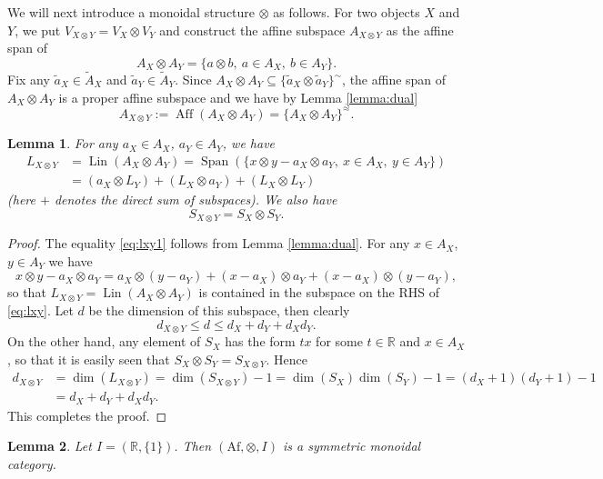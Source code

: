 \documentclass[12pt]{article}
\newtheorem{lemma}{Lemma}
\theoremstyle{definition}
\theoremstyle{remark}
\def\aff{\operatorname{Aff}}
\def\lin{\operatorname{Lin}}
\def\Span{\operatorname{Span}}
\def \Af{\mathrm{Af}}
\begin{document}
We will next introduce a monoidal structure $\otimes$ as follows. For two objects $X$ and
$Y$, we put  $V_{X\otimes Y}=V_X\otimes V_Y$ and construct the affine subspace
$A_{X\otimes Y}$ as the affine span of 
\[
A_X\otimes A_Y=\{a\otimes b,\ a\in A_X,\ b\in A_Y\}.
\]
Fix any $\tilde a_X\in \tilde A_X$ and $\tilde a_Y\in \tilde A_Y$. 
Since $A_X\otimes A_Y\subseteq \{\tilde a_X\otimes \tilde a_Y\}^\sim$, the affine span of
$A_X\otimes A_Y$ is a proper affine subspace and we have by Lemma \ref{lemma:dual}
\[
A_{X\otimes Y}:=\aff(A_X\otimes A_Y)=\{A_X\otimes A_Y\}^{\approx}.
\]
\begin{lemma}\label{lemma:tensor_spaces}
For any $a_X\in A_X$, $a_Y\in A_Y$, we  have
\begin{align}
L_{X\otimes Y}&=\lin(A_X\otimes A_Y)=\Span(\{x\otimes y-a_X\otimes a_Y,\ x\in A_X,\ y\in
A_Y\})\label{eq:lxy1}\\
&= (a_X\otimes L_Y)+ (L_X\otimes a_Y)+ (L_X\otimes L_Y)\label{eq:lxy}
\end{align}
(here $+$ denotes the direct sum of subspaces). We also have
\[
S_{X\otimes Y}=S_X\otimes S_Y.
\]
\end{lemma}

\begin{proof} The equality \eqref{eq:lxy1} follows from Lemma \ref{lemma:dual}. For any $x\in A_X$, $y\in A_Y$
 we have
\[
x\otimes y-a_X\otimes a_Y=a_X\otimes (y-a_Y)+(x-a_X)\otimes a_Y+(x-a_X)\otimes (y-a_Y),
\]
so that $L_{X\otimes Y}=\lin(A_X\otimes A_Y)$ is contained in the subspace on the RHS of \eqref{eq:lxy}.
Let $d$ be the dimension of this subspace, then clearly
\[
d_{X\otimes Y}\le d\le d_X+d_Y+d_Xd_Y.
\]
On the other hand, any element of $S_X$ has the form $tx$ for some $t\in \mathbb R$ and
$x\in A_X$, so that it is easily seen that $S_X\otimes S_Y=S_{X\otimes Y}$. 
Hence 
\begin{align*}
d_{X\otimes Y}&=\dim(L_{X\otimes Y})=\dim(S_{X\otimes
Y})-1=\dim(S_X)\dim(S_Y)-1=(d_X+1)(d_Y+1)-1\\
&=d_X+d_Y+d_Xd_Y.
\end{align*}
This completes the proof.

\end{proof}




\begin{lemma}\label{lemma:monoidal} Let $I=(\mathbb R,\{1\})$. Then 
$(\Af,\otimes, I)$ is a symmetric monoidal category.
\end{lemma}
\end{document}

